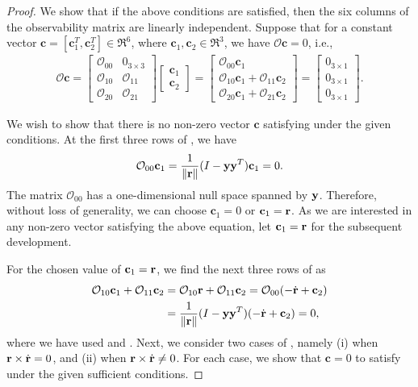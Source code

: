 \begin{proof}
We show that if the above conditions are satisfied, then the six columns of the observability matrix are linearly independent. Suppose that for a constant vector $\mathbf{c}=[\mathbf{c}_1^T,\mathbf{c}_2^T]\in\Re^6$, where $\mathbf{c}_1,\mathbf{c}_2\in\Re^3$, we have $\mathcal{O}\mathbf{c}=0$, i.e., 
\begin{align}
\mathcal{O} \mathbf{c} = \begin{bmatrix}
\mathcal{O}_{00} & 0_{3\times 3}\\
\mathcal{O}_{10} & \mathcal{O}_{11}\\
\mathcal{O}_{20} & \mathcal{O}_{21}
\end{bmatrix}
\begin{bmatrix} \mathbf{c}_1 \\ \mathbf{c}_2 \end{bmatrix}
=
\begin{bmatrix}
\mathcal{O}_{00}\mathbf{c}_1\\
\mathcal{O}_{10}\mathbf{c}_1+ \mathcal{O}_{11}\mathbf{c}_2\\
\mathcal{O}_{20}\mathbf{c}_1+ \mathcal{O}_{21}\mathbf{c}_2
\end{bmatrix}
=
\begin{bmatrix}
0_{3\times 1}\\
0_{3\times 1}\\
0_{3\times 1}
\end{bmatrix}.\label{eqn:Oc}
\end{align}

We wish to show that there is no non-zero vector $\mathbf{c}$ satisfying  under the given conditions. At the first three rows of , we have
\begin{align}
\mathcal{O}_{00} \mathbf{c}_1 = \frac{1}{\|\mathbf{r}\|}(I-\mathbf{y}\mathbf{y}^T) \mathbf{c}_1 = 0.\label{eqn:c10}
\end{align}
The matrix $\mathcal{O}_{00}$ has a one-dimensional null space spanned by $\mathbf{y}$. Therefore, without loss of generality, we can choose $\mathbf{c}_1=0$ or $\mathbf{c}_1=\mathbf{r}$. As we are interested in any non-zero vector satisfying the above equation, let $\mathbf{c}_1=\mathbf{r}$ for the subsequent development.

For the chosen value of $\mathbf{c}_1=\mathbf{r}$, we find the next three rows of  as
\begin{align}
\mathcal{O}_{10} \mathbf{c}_1 +\mathcal{O}_{11} \mathbf{c}_2 & = \mathcal{O}_{10} \mathbf{r} +\mathcal{O}_{11} \mathbf{c}_2  = \mathcal{O}_{00} (-\dot{\mathbf{r}} + \mathbf{c}_2)\nonumber\\
& = \frac{1}{\|\mathbf{r}\|}(I-\mathbf{y}\mathbf{y}^T)(-\dot{\mathbf{r}} + \mathbf{c}_2)=0,\label{eqn:row2}
\end{align}
where we have used  and . Next, we consider two cases of , namely (i) when $\mathbf{r}\times\dot{\mathbf{r}}=0$, and (ii) when $\mathbf{r}\times\dot{\mathbf{r}}\neq 0$. For each case, we show that $\mathbf{c}=0$ to satisfy  under the given sufficient conditions.


\end{proof}
